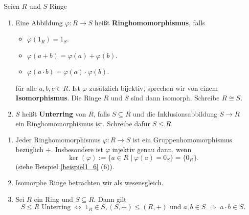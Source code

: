 \begin{definition}
	Seien $R$ und $S$ Ringe 
	\begin{enumerate}[label=(\alph*)]
		\item Eine Abbildung $\varphi \colon R \to S$ heißt \textbf{Ringhomomorphismus}, falls 
		\begin{itemize}
			\item $\varphi(1_R) = 1_S$.
			\item $\varphi(a+ b) = \varphi(a) + \varphi(b)$.
			\item $\varphi(a\cdot b) = \varphi(a) \cdot \varphi(b)$.
		\end{itemize}
		für alle $a,b,c \in R$. Ist $\varphi$ zusätzlich bijektiv, sprechen wir von einem \textbf{Isomorphismus}. Die Ringe $R$ und $S$ sind dann isomorph. Schreibe $R \cong S$.
		\item $S$ heißt \textbf{Unterring} von $R$, falls $S \subseteq R$ und die Inklusionsabbildung $S \to R$ ein Ringhomomorphismus ist. Schreibe dafür $S \leq R$.
	\end{enumerate}
\end{definition}
\begin{rem}\label{rem4_5}
	\begin{enumerate}[label=(\roman*)]
		\item Jeder Ringhomomorphismus $\varphi \colon R \to S$ ist ein Gruppenhomomorphismus bezüglich $+$. Insbesondere ist $\varphi$ injektiv genau dann, wenn
		\[\ker(\varphi) := \{a \in R \mid \varphi(a) = 0_S\} = \{0_R\}.\]
		(siehe Beispiel \ref{beispiel1_6} (6)).
		\item Isomorphe Ringe betrachten wir als wesensgleich.
		\item Sei $R$ ein Ring und $S \subseteq R$. Dann gilt 
		\[S \leq R \text{ Unterring} \;\Leftrightarrow\; 1_R \in S, (S, +) \leq (R,+) \text{ und } a,b \in S \;\Rightarrow\; a\cdot b \in S.\]
	\end{enumerate}
\end{rem}
